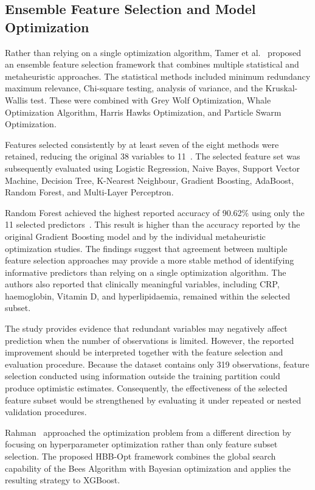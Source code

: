 \subsection{Ensemble Feature Selection and Model Optimization}

Rather than relying on a single optimization algorithm, Tamer et al.~\cite{tamer2026novel} proposed an ensemble feature selection framework that combines multiple statistical and metaheuristic approaches. The statistical methods included minimum redundancy maximum relevance, Chi-square testing, analysis of variance, and the Kruskal-Wallis test. These were combined with Grey Wolf Optimization, Whale Optimization Algorithm, Harris Hawks Optimization, and Particle Swarm Optimization.

Features selected consistently by at least seven of the eight methods were retained, reducing the original 38 variables to 11~\cite{tamer2026novel}. The selected feature set was subsequently evaluated using Logistic Regression, Naive Bayes, Support Vector Machine, Decision Tree, K-Nearest Neighbour, Gradient Boosting, AdaBoost, Random Forest, and Multi-Layer Perceptron.

Random Forest achieved the highest reported accuracy of 90.62\% using only the 11 selected predictors~\cite{tamer2026novel}. This result is higher than the accuracy reported by the original Gradient Boosting model and by the individual metaheuristic optimization studies. The findings suggest that agreement between multiple feature selection approaches may provide a more stable method of identifying informative predictors than relying on a single optimization algorithm. The authors also reported that clinically meaningful variables, including CRP, haemoglobin, Vitamin D, and hyperlipidaemia, remained within the selected subset.

The study provides evidence that redundant variables may negatively affect prediction when the number of observations is limited. However, the reported improvement should be interpreted together with the feature selection and evaluation procedure. Because the dataset contains only 319 observations, feature selection conducted using information outside the training partition could produce optimistic estimates. Consequently, the effectiveness of the selected feature subset would be strengthened by evaluating it under repeated or nested validation procedures.

Rahman~\cite{rahman2026hbb} approached the optimization problem from a different direction by focusing on hyperparameter optimization rather than only feature subset selection. The proposed HBB-Opt framework combines the global search capability of the Bees Algorithm with Bayesian optimization and applies the resulting strategy to XGBoost.

